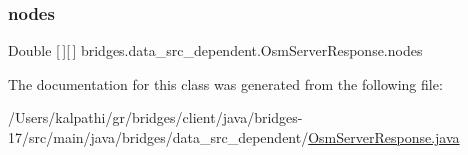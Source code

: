 \subsubsection{\texorpdfstring{nodes}{nodes}}
{\footnotesize\ttfamily Double \mbox{[}$\,$\mbox{]}\mbox{[}$\,$\mbox{]} bridges.\+data\+\_\+src\+\_\+dependent.\+Osm\+Server\+Response.\+nodes}



The documentation for this class was generated from the following file\+:\begin{DoxyCompactItemize}
\item 
/\+Users/kalpathi/gr/bridges/client/java/bridges-\/17/src/main/java/bridges/data\+\_\+src\+\_\+dependent/\mbox{\hyperlink{_osm_server_response_8java}{Osm\+Server\+Response.\+java}}\end{DoxyCompactItemize}
